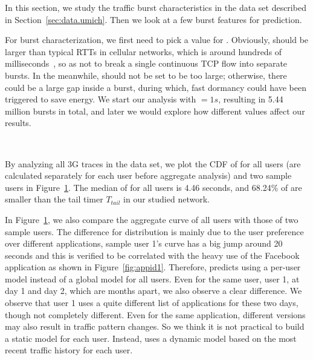 \label{sec:stats}

In this section, we study the traffic burst characteristics in the \UMICH data set described in Section~\ref{sec:data.umich}. Then we look at a few burst features for \IBT prediction.

For burst characterization, we first need to pick a value for \BT. Obviously, \BT should be larger than typical RTTs in cellular networks, which is around hundreds of milliseconds~\cite{mobisys.3gtest, huang_mobisys12}, so as not to break a single continuous TCP flow into separate bursts. In the meanwhile, \BT should not be set to be too large; otherwise, there could be a large gap inside a burst, during which, fast dormancy could have been triggered to save energy. We start our analysis with \BT $= 1s$, resulting in 5.44 million bursts in total, and later we would explore how different \BT values affect our results.

\begin{figure}[t]
\centering
{} \\
\label{fig:cdf.ibt}
\end{figure}


By analyzing all 3G traces in the \UMICH data set, we plot the CDF of \IBTS for all users (\IBTS are calculated separately for each user before aggregate analysis) and two sample users in Figure~\ref{fig:cdf.ibt}. The median of \IBT for all users is 4.46 seconds, and 68.24\% of \IBTS are smaller than the tail timer $T_{tail}$ in our studied network.

In Figure~\ref{fig:cdf.ibt}, we also compare the aggregate curve of all users with those of two sample users. The difference for \IBT distribution is mainly due to the user preference over different applications, \eg sample user 1's curve has a big jump around 20 seconds and this is verified to be correlated with the heavy use of the Facebook application as shown in Figure~\ref{fig:appid1}. Therefore, \NAME predicts \IBT using a per-user model instead of a global model for all users. Even for the same user, \ie user 1, at day 1 and day 2, which are months apart, we also observe a clear difference. We observe that user 1 uses a quite different list of applications for these two days, though not completely different. Even for the same application, different versions may also result in traffic pattern changes. So we think it is not practical to build a static model for each user. Instead, \NAME uses a dynamic model based on the most recent traffic history for each user.



